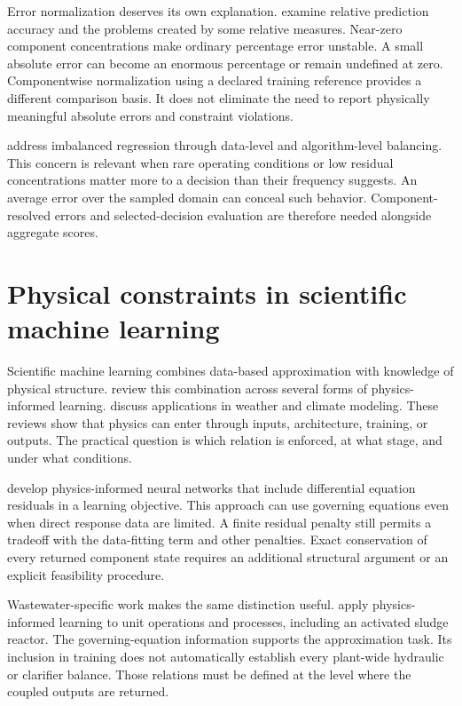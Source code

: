 Error normalization deserves its own explanation. \citet{Tofallis2015} examine relative prediction accuracy and the problems created by some relative measures. Near-zero component concentrations make ordinary percentage error unstable. A small absolute error can become an enormous percentage or remain undefined at zero. Componentwise normalization using a declared training reference provides a different comparison basis. It does not eliminate the need to report physically meaningful absolute errors and constraint violations.

\citet{Shahbazi2026} address imbalanced regression through data-level and algorithm-level balancing. This concern is relevant when rare operating conditions or low residual concentrations matter more to a decision than their frequency suggests. An average error over the sampled domain can conceal such behavior. Component-resolved errors and selected-decision evaluation are therefore needed alongside aggregate scores.

\section{Physical constraints in scientific machine learning}

Scientific machine learning combines data-based approximation with knowledge of physical structure. \citet{Karniadakis2021} review this combination across several forms of physics-informed learning. \citet{Kashinath2021} discuss applications in weather and climate modeling. These reviews show that physics can enter through inputs, architecture, training, or outputs. The practical question is which relation is enforced, at what stage, and under what conditions.

\citet{Raissi2019} develop physics-informed neural networks that include differential equation residuals in a learning objective. This approach can use governing equations even when direct response data are limited. A finite residual penalty still permits a tradeoff with the data-fitting term and other penalties. Exact conservation of every returned component state requires an additional structural argument or an explicit feasibility procedure.

Wastewater-specific work makes the same distinction useful. \citet{Li2024} apply physics-informed learning to unit operations and processes, including an activated sludge reactor. The governing-equation information supports the approximation task. Its inclusion in training does not automatically establish every plant-wide hydraulic or clarifier balance. Those relations must be defined at the level where the coupled outputs are returned.

